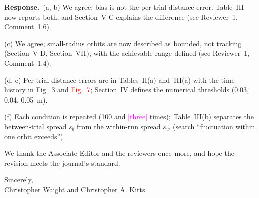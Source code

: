 \documentclass[10pt]{article}
\newcommand{\syn}[1]{\textcolor{red}{#1}}            %
\newcommand{\rev}[1]{#1}                             %
\newcommand{\open}[1]{\textcolor{magenta}{[#1]}}     %
\newcommand{\resp}{\par\textbf{Response.}~}
\begin{document}
\resp (a, b) We agree; bias is not the per-trial distance error. Table~III now reports both, and Section~V-C explains the difference (see Reviewer~1, Comment~1.6).

(c) We agree; small-radius orbits are now described as bounded, not tracking (Section~V-D, Section~VII), with the achievable range defined (see Reviewer~1, Comment~1.4).

(d, e) Per-trial distance errors are in Tables~II(a) and~III(a) with the time history in Fig.~3 and \syn{Fig.~7}; Section~IV defines the numerical thresholds (0.03, 0.04, 0.05~m).

(f) Each condition is repeated (\rev{100} and \open{three} times); Table~III(b) separates the between-trial spread $s_b$ from the within-run spread $s_w$ (search ``fluctuation within one orbit exceeds'').

\vspace{6pt}
We thank the Associate Editor and the reviewers once more, and hope the revision meets the journal's standard.

Sincerely,\\
Christopher Waight and Christopher A. Kitts
\end{document}
